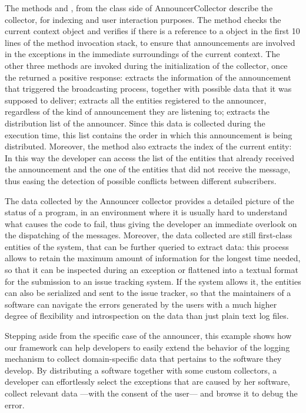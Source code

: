 The methods  and , from the class side of AnnouncerCollector describe the collector, for indexing and user interaction purposes.
The method  checks the current context object and verifies if there is a reference to a  object in the first 10 lines of the method invocation stack, to ensure that announcements are involved in the exceptions in the immediate surroundings of the current context.
The other three methods are invoked during the initialization of the collector, once the  returned a positive response:
 extracts the information of the announcement that triggered the broadcasting process, together with possible data that it was supposed to deliver;
 extracts all the entities registered to the announcer, regardless of the kind of announcement they are listening to;
 extracts the distribution list of the announcer.
Since this data is collected during the execution time, this list contains the order in which this announcement is being distributed.
Moreover, the method also extracts the index of the current entity: In this way the developer can access the list of the entities that already received the announcement and the one of the entities that did not receive the message, thus easing the detection of possible conflicts between different subscribers.

The data collected by the Announcer collector provides a detailed picture of the status of a program, in an environment where it is usually hard to understand what causes the code to fail, thus giving the developer an immediate overlook on the dispatching of the messages.
Moreover, the data collected are still first-class entities of the system, that can be further queried to extract data: this process allows to retain the maximum amount of information for the longest time needed, so that it can be inspected during an exception or flattened into a textual format for the submission to an issue tracking system.
If the system allows it, the entities can also be serialized and sent to the issue tracker, so that the maintainers of a software can navigate the errors generated by the users with a much higher degree of flexibility and introspection on the data than just plain text log files.

Stepping aside from the specific case of the announcer, this example shows how our framework can help developers to easily extend the behavior of the logging mechanism to collect domain-specific data that pertains to the software they develop.
By distributing a software together with some custom collectors, a developer can effortlessly select the exceptions that are caused by her software, collect relevant data ---with the consent of the user--- and browse it to debug the error.

